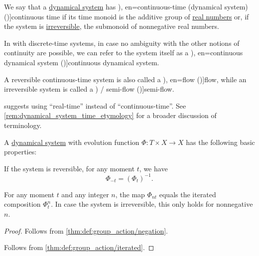\begin{definition}\label{def:continuous_dynamical_system}\mimprovised
  We say that a \hyperref[def:dynamical_system]{dynamical system} has \term[ru=(динамическая система с) непрерывным временем (\cite[8]{Юмагулов2015ДинамическиеСистемы}), en=continuous-time (dynamical system) (\cite[2]{BrinStuck2002DynamicalSystems})]{continuous time} if its time monoid is the additive group of \hyperref[def:real_numbers]{real numbers} or, if the system is \hyperref[def:reversible_dynamical_system]{irreversible}, the submonoid of nonnegative real numbers.

  In with discrete-time systems, in case no ambiguity with the other notions of continuity are possible, we can refer to the system itself as a \term[ru=непрарывная динамическая система (\cite[8]{Юмагулов2015ДинамическиеСистемы}), en=continuous dynamical system (\cite[21]{Müller2022HandbookOfDynamicsAndProbability})]{continuous dynamical system}.

  A reversible continuous-time system is also called a \term[ru=поток (\cite[10]{Юмагулов2015ДинамическиеСистемы}), en=flow (\cite[2]{BrinStuck2002DynamicalSystems})]{flow}, while an irreversible system is called a \term[en=semiflow (\cite[2]{BrinStuck2002DynamicalSystems}) / semi-flow (\cite[363]{Rozikov2012MultiDimensionalTimeDynamicalSystem})]{semi-flow}.
\end{definition}
\begin{comments}
  \item \Textcite[363]{Rozikov2012MultiDimensionalTimeDynamicalSystem} suggests using \enquote{real-time} instead of \enquote{continuous-time}. See \cref{rem:dynamical_system_time_etymology} for a broader discussion of terminology.
\end{comments}

\begin{proposition}\label{thm:def:dynamical_system}
  A \hyperref[def:dynamical_system]{dynamical system} with evolution function \( \Phi: T \times X \to X \) has the following basic properties:
  \begin{thmenum}
     If the system is reversible, for any moment \( t \), we have
    \begin{equation}\label{eq:thm:def:dynamical_system/negation}
      \Phi_{-t} = (\Phi_t)^{-1}.
    \end{equation}

     For any moment \( t \) and any integer \( n \), the map \( \Phi_{nt} \) equals the iterated composition \( \Phi_t^n \). In case the system is irreversible, this only holds for nonnegative \( n \).
  \end{thmenum}
\end{proposition}
\begin{proof}
   Follows from \cref{thm:def:group_action/negation}.

   Follows from \cref{thm:def:group_action/iterated}.
\end{proof}

